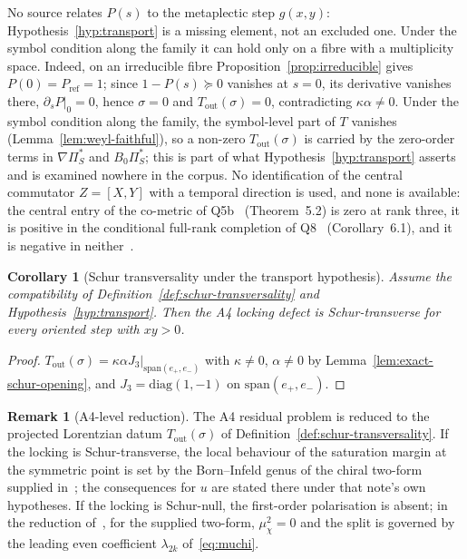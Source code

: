 \documentclass[11pt]{article}
\newtheorem{corollary}{Corollary}
\theoremstyle{definition}
\newtheorem{remark}{Remark}
\newcommand{\PiS}{\Pi_S}
\begin{document}
    No source relates $P(s)$ to the metaplectic step $g(x,y)$: Hypothesis~\ref{hyp:transport} is a missing element,
    not an excluded one.
    Under the symbol condition along the family it can hold only on a fibre with a multiplicity space.
    Indeed, on an irreducible fibre Proposition~\ref{prop:irreducible} gives $P(0)=P_{\mathrm{ref}}=1$; since
    $1-P(s)\succeq0$ vanishes at $s=0$, its derivative vanishes there, $\partial_sP|_0=0$, hence $\sigma=0$ and
    $T_{\mathrm{out}}(\sigma)=0$, contradicting $\kappa\alpha\neq0$.
    Under the symbol condition along the family, the symbol-level part of $T$ vanishes
    (Lemma~\ref{lem:weyl-faithful}), so a non-zero $T_{\mathrm{out}}(\sigma)$ is carried by the zero-order terms in
    $\nabla\PiS^{*}$ and $B_0\PiS^{*}$; this is part of what Hypothesis~\ref{hyp:transport} asserts and is examined
    nowhere in the corpus.
    No identification of the central commutator $Z=[X,Y]$ with a temporal direction is used, and none is available:
    the central entry of the co-metric of Q5b~\cite{Beau2026q5b} (Theorem~5.2) is zero at rank three, it is positive in
    the conditional full-rank completion of Q8~\cite{BeauQ8} (Corollary~6.1), and it is negative in
    neither~\cite{Beau2026q11}.

    \begin{corollary}[Schur transversality under the transport hypothesis]
      \label{cor:schur-transversality-closed}
      Assume the compatibility of Definition~\ref{def:schur-transversality} and Hypothesis~\ref{hyp:transport}.
      Then the A4 locking defect is Schur-transverse for every oriented step with $xy>0$.
    \end{corollary}

    \begin{proof}
      $T_{\mathrm{out}}(\sigma)=\kappa\alpha J_3|_{\mathrm{span}(e_+,e_-)}$ with $\kappa\neq0$, $\alpha\neq0$ by
      Lemma~\ref{lem:exact-schur-opening}, and $J_3=\mathrm{diag}(1,-1)$ on $\mathrm{span}(e_+,e_-)$.
    \end{proof}

    \begin{remark}[A4-level reduction]
      \label{cor:a4-reduction}
      The A4 residual problem is reduced to the projected Lorentzian datum $T_{\mathrm{out}}(\sigma)$ of
      Definition~\ref{def:schur-transversality}.
      If the locking is Schur-transverse, the local behaviour of the saturation margin at the symmetric point is set by
      the Born--Infeld genus of the chiral two-form supplied in~\cite{Beau2026bim}; the consequences for $u$ are
      stated there under that note's own hypotheses.
      If the locking is Schur-null, the first-order polarisation is absent; in the reduction of~\cite{Beau2026bim}, for
      the supplied two-form, $\mu_\chi^2=0$ and the split is governed by the leading even coefficient $\lambda_{2k}$
      of~\eqref{eq:muchi}.
    \end{remark}
\end{document}
